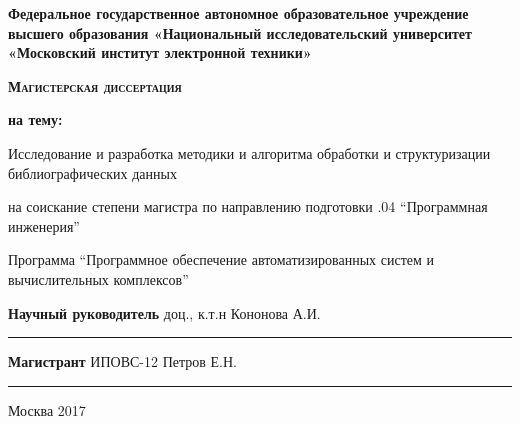 \newpage

\begin{center}
\textbf{Федеральное государственное автономное образовательное учреждение высшего образования «Национальный исследовательский университет «Московский институт электронной техники»}
\end{center}


\vspace{6em}

\begin{center}
\textsc{\textbf{Магистерская диссертация}}
\end{center}

\begin{center}
\textbf{на тему:}
\end{center}

\vspace{1.0em}

\begin{center}
Исследование и разработка методики и алгоритма обработки и структуризации библиографических данных
\end{center}

\vspace{1em}

\begin{center}
на соискание степени магистра по направлению подготовки .04 “Программная инженерия”
\end{center}

\begin{center}
Программа “Программное обеспечение автоматизированных систем и \linebreak
вычислительных комплексов”
\end{center}

\vspace{\fill}

\begin{flushright}
\textbf{Научный руководитель} доц., к.т.н \linebreak
Кононова А.И. \linebreak
\rule{5cm}{.1pt}

\vspace{1em}

\textbf{Магистрант} ИПОВС-12 \linebreak
Петров Е.Н. \linebreak
\rule{5cm}{.1pt}
\end{flushright}

\begin{center}
Москва 2017
\end{center}

\thispagestyle{empty}